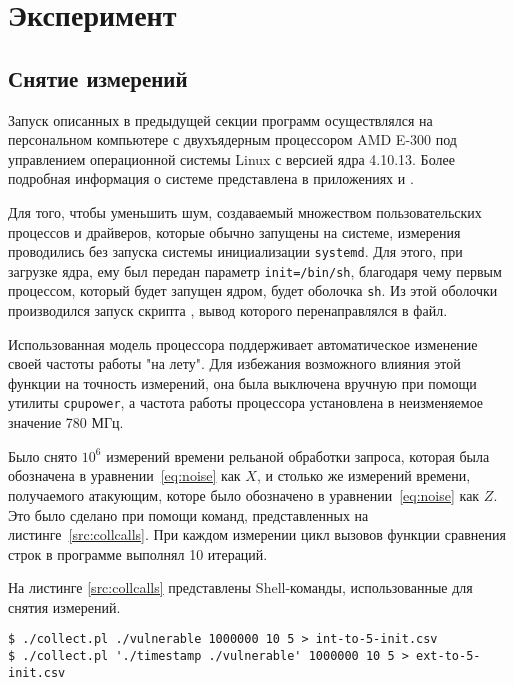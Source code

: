 \section{Эксперимент} \label{sec:experiment}

\subsection{Снятие измерений}

Запуск описанных в предыдущей секции программ осуществлялся на персональном компьютере с двухъядерным
процессором AMD E-300 под управлением операционной системы Linux с версией ядра
4.10.13. Более подробная информация о системе представлена в приложениях
 и .

Для того, чтобы уменьшить шум, создаваемый множеством пользовательских процессов
и драйверов, которые обычно запущены на системе, измерения проводились без запуска
системы инициализации \texttt{systemd}. Для этого, при загрузке ядра, ему был
передан параметр \texttt{init=/bin/sh}, благодаря чему первым процессом, который
будет запущен ядром, будет оболочка \texttt{sh}. Из этой оболочки производился
запуск скрипта , вывод которого перенаправлялся в файл.

Использованная модель процессора поддерживает автоматическое изменение своей частоты
работы "на лету". Для избежания возможного влияния этой функции на точность измерений,
она была выключена вручную при помощи утилиты \texttt{cpupower},
а частота работы процессора установлена в неизменяемое значение 780 МГц.

Было снято $10^6$ измерений времени рельаной обработки запроса, которая была обозначена в
уравнении~\ref{eq:noise} как $X$, и столько же измерений времени, получаемого атакующим,
которе было обозначено в уравнении~\ref{eq:noise} как $Z$. Это было сделано при помощи
команд, представленных на листинге~\ref{src:collcalls}. При каждом измерении цикл
вызовов функции сравнения строк в программе  выполнял 10 итераций.

На листинге \ref{src:collcalls} представлены Shell-команды, использованные для снятия
измерений.

\nopagebreak

\begin{lstlisting}[caption=Команды снятия измерений, label=src:collcalls]
$ ./collect.pl ./vulnerable 1000000 10 5 > int-to-5-init.csv
$ ./collect.pl './timestamp ./vulnerable' 1000000 10 5 > ext-to-5-init.csv
\end{lstlisting}

